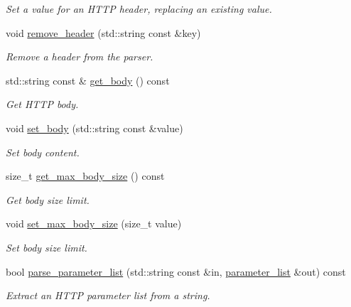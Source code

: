 \begin{DoxyCompactItemize}
\begin{DoxyCompactList}\small\item\em Set a value for an H\+T\+TP header, replacing an existing value. \end{DoxyCompactList}\item 
void \hyperlink{classwebsocketpp_1_1http_1_1parser_1_1parser_a64ff49a6a1ddbf70b9767874ffdd513e}{remove\+\_\+header} (std\+::string const \&key)
\begin{DoxyCompactList}\small\item\em Remove a header from the parser. \end{DoxyCompactList}\item 
std\+::string const  \& \hyperlink{classwebsocketpp_1_1http_1_1parser_1_1parser_af3014114c0e5506f96d66126a53db203}{get\+\_\+body} () const
\begin{DoxyCompactList}\small\item\em Get H\+T\+TP body. \end{DoxyCompactList}\item 
void \hyperlink{classwebsocketpp_1_1http_1_1parser_1_1parser_a71a4989eaa0ca802cf77678d0ca2d70d}{set\+\_\+body} (std\+::string const \&value)
\begin{DoxyCompactList}\small\item\em Set body content. \end{DoxyCompactList}\item 
size\+\_\+t \hyperlink{classwebsocketpp_1_1http_1_1parser_1_1parser_afa455a5f6dca3989ccd56a87181119f2}{get\+\_\+max\+\_\+body\+\_\+size} () const
\begin{DoxyCompactList}\small\item\em Get body size limit. \end{DoxyCompactList}\item 
void \hyperlink{classwebsocketpp_1_1http_1_1parser_1_1parser_ab6583e865254d1608732498d839d8385}{set\+\_\+max\+\_\+body\+\_\+size} (size\+\_\+t value)
\begin{DoxyCompactList}\small\item\em Set body size limit. \end{DoxyCompactList}\item 
bool \hyperlink{classwebsocketpp_1_1http_1_1parser_1_1parser_af903e5538e362d9ac0aeaea3064aed0c}{parse\+\_\+parameter\+\_\+list} (std\+::string const \&in, \hyperlink{namespacewebsocketpp_1_1http_a2c285bc959df5a63bf962bed842fccfb}{parameter\+\_\+list} \&out) const
\begin{DoxyCompactList}\small\item\em Extract an H\+T\+TP parameter list from a string. \end{DoxyCompactList}\end{DoxyCompactItemize}
